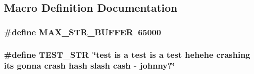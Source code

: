 \subsection{Macro Definition Documentation}
\hypertarget{test-expression_8c_a1501fcc30671da220e9a1a5d7431cd1e}{
\subsubsection[{M\+A\+X\+\_\+\+S\+T\+R\+\_\+\+B\+U\+F\+F\+E\+R}]{\setlength{\rightskip}{0pt plus 5cm}\#{\bf define} M\+A\+X\+\_\+\+S\+T\+R\+\_\+\+B\+U\+F\+F\+E\+R~65000}}\label{test-expression_8c_a1501fcc30671da220e9a1a5d7431cd1e}
\hypertarget{test-expression_8c_a6a34912fc5493f286fedf636a498bc79}{
\subsubsection[{T\+E\+S\+T\+\_\+\+S\+T\+R}]{\setlength{\rightskip}{0pt plus 5cm}\#{\bf define} T\+E\+S\+T\+\_\+\+S\+T\+R~\char`\"{}test is a {\bf test} is a {\bf test} hehehe crashing its gonna crash hash slash cash -\/ johnny?\char`\"{}}}\label{test-expression_8c_a6a34912fc5493f286fedf636a498bc79}



